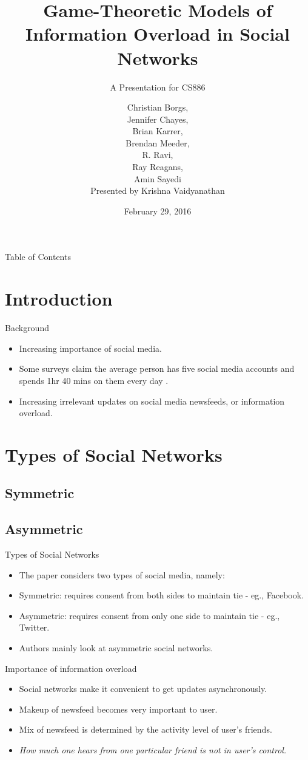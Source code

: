 \documentclass[aspectratio=169]{beamer}
\title[Game-Theoretic Models]{Game-Theoretic Models of Information Overload in Social Networks}
\subtitle{A Presentation for CS886}
\author[Presented by Krishna Vaidyanathan]{Christian Borgs,\\Jennifer
    Chayes,\\Brian Karrer,\\Brendan Meeder,\\R. Ravi,\\Ray Reagans,\\Amin
    Sayedi\\\vspace{1em}Presented by Krishna Vaidyanathan}
\date{February 29, 2016}
\newcommand{\bi}{\begin{itemize}}
\newcommand{\ei}{\end{itemize}}
\begin{document}
\frame[plain]{\titlepage}

\begin{frame}{Table of Contents}
\tableofcontents
\end{frame}

\section{Introduction}
\begin{frame}{Background}
    \bi
\item Increasing importance of social media.
    \pause
\item Some surveys claim the average person has five social media accounts and
    spends 1hr 40 mins on them every day \cite{telegraph15}.
    \pause
\item Increasing irrelevant updates on social media newsfeeds, or information overload.
    \ei
\end{frame}

\section{Types of Social Networks}
\subsection{Symmetric}
\subsection{Asymmetric}
\begin{frame}{Types of Social Networks}
    \bi
\item The paper considers two types of social media, namely:
    \pause
\item Symmetric: requires consent from both sides to maintain tie - eg.,
    Facebook.
    \pause
\item Asymmetric: requires consent from only one side to maintain tie - eg.,
    Twitter.
    \pause
\item Authors mainly look at asymmetric social networks.
    \ei
\end{frame}

\begin{frame}{Importance of information overload}
    \bi
\item Social networks make it convenient to get updates asynchronously.
    \pause
\item Makeup of newsfeed becomes very important to user.
    \pause
\item Mix of newsfeed is determined by the activity level of user's friends.
    \pause
\item \textit{How much one hears from one particular friend is not in user's 
        control.}
    \ei
\end{frame}
\end{document}
